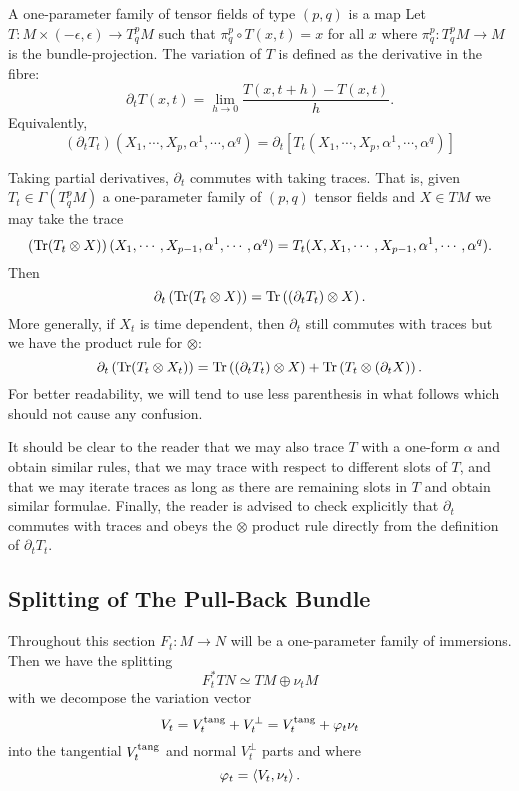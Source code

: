 \begin{defn}
A one-parameter family of tensor fields of type \((p, q)\) is a map
Let \(T : M \times (-\epsilon, \epsilon) \to T^p_q M\) such that \(\pi^p_q \circ T(x, t) = x\) for all \(x\) where \(\pi^p_q : T^p_q M \to M\) is the bundle-projection. The variation of \(T\) is defined as the derivative in the fibre:
\[
\partial_t T (x, t) = \lim_{h\to 0} \frac{T(x, t + h) - T(x, t)}{h}.
\]
Equivalently,
\[
(\partial_t T_t) (X_1, \cdots, X_p, \alpha^1, \cdots, \alpha^q) = \partial_t \left[T_t (X_1, \cdots, X_p, \alpha^1, \cdots, \alpha^q)\right]
\]
\end{defn}

\begin{rem}
\label{rem:dt_traces}
Taking partial derivatives, \(\partial_t\) commutes with taking traces. That is, given \(T_t \in \Gamma(T^p_q M)\) a one-parameter family of \((p,q)\) tensor fields and \(X \in TM\) we may take the trace
\[
\left(\operatorname{Tr} (T_t \otimes X)\right) (X_1, \cdots, X_{p-1}, \alpha^1, \cdots, \alpha^q) = T_t(X, X_1, \cdots, X_{p-1}, \alpha^1, \cdots, \alpha^q).
\]
Then
\[
\partial_t \left(\operatorname{Tr} (T_t \otimes X)\right) = \operatorname{Tr} \left((\partial_t T_t) \otimes X\right).
\]
More generally, if \(X_t\) is time dependent, then \(\partial_t\) still commutes with traces but we have the product rule for \(\otimes\):
\[
\partial_t \left(\operatorname{Tr} (T_t \otimes X_t)\right) = \operatorname{Tr} \left((\partial_t T_t) \otimes X\right) + \operatorname{Tr} \left(T_t \otimes (\partial_t X)\right).
\]
For better readability, we will tend to use less parenthesis in what follows which should not cause any confusion.

It should be clear to the reader that we may also trace \(T\) with a one-form \(\alpha\) and obtain similar rules, that we may trace with respect to different slots of \(T\), and that we may iterate traces as long as there are remaining slots in \(T\) and obtain similar formulae. Finally, the reader is advised to check explicitly that \(\partial_t\) commutes with traces and obeys the \(\otimes\) product rule directly from the definition of \(\partial_t T_t\).
\end{rem}

\subsection*{Splitting of The Pull-Back Bundle}

Throughout this section \(F_t : M \to N\) will be a one-parameter family of immersions. Then we have the splitting
\[
F_t^{\ast} TN \simeq TM \oplus \nu_t M
\]
with we decompose the variation vector
\[
V_t = V^{\operatorname{tang}}_t + V^{\perp}_t = V^{\operatorname{tang}}_t + \varphi_t \nu_t
\]
into the tangential \(V^{\operatorname{tang}}_t\) and normal \(V^{\perp}_t\) parts and where
\[
\varphi_t = \left\langle V_t,\nu_t \right\rangle.
\]

